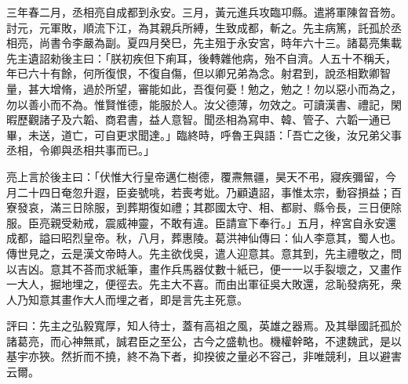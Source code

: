 \begin{pinyinscope}
三年春二月，丞相亮自成都到永安。三月，黃元進兵攻臨卭縣。遣將軍陳曶音笏。討元，元軍敗，順流下江，為其親兵所縛，生致成都，斬之。先主病篤，託孤於丞相亮，尚書令李嚴為副。夏四月癸巳，先主殂于永安宮，時年六十三。諸葛亮集載先主遺詔勑後主曰：「朕初疾但下痢耳，後轉雜他病，殆不自濟。人五十不稱夭，年已六十有餘，何所復恨，不復自傷，但以卿兄弟為念。射君到，說丞相歎卿智量，甚大增脩，過於所望，審能如此，吾復何憂！勉之，勉之！勿以惡小而為之，勿以善小而不為。惟賢惟德，能服於人。汝父德薄，勿效之。可讀漢書、禮記，閑暇歷觀諸子及六韜、商君書，益人意智。聞丞相為寫申、韓、管子、六韜一通已畢，未送，道亡，可自更求聞達。」臨終時，呼魯王與語：「吾亡之後，汝兄弟父事丞相，令卿與丞相共事而已。」

亮上言於後主曰：「伏惟大行皇帝邁仁樹德，覆燾無疆，昊天不弔，寢疾彌留，今月二十四日奄忽升遐，臣妾號咷，若喪考妣。乃顧遺詔，事惟太宗，動容損益；百寮發哀，滿三日除服，到葬期復如禮；其郡國太守、相、都尉、縣令長，三日便除服。臣亮親受勑戒，震威神靈，不敢有違。臣請宣下奉行。」五月，梓宮自永安還成都，謚曰昭烈皇帝。秋，八月，葬惠陵。葛洪神仙傳曰：仙人李意其，蜀人也。傳世見之，云是漢文帝時人。先主欲伐吳，遣人迎意其。意其到，先主禮敬之，問以吉凶。意其不荅而求紙筆，畫作兵馬器仗數十紙已，便一一以手裂壞之，又畫作一大人，掘地埋之，便徑去。先主大不喜。而由出軍征吳大敗還，忿恥發病死，衆人乃知意其畫作大人而埋之者，即是言先主死意。

評曰：先主之弘毅寬厚，知人待士，蓋有高祖之風，英雄之器焉。及其舉國託孤於諸葛亮，而心神無貳，誠君臣之至公，古今之盛軌也。機權幹略，不逮魏武，是以基宇亦狹。然折而不撓，終不為下者，抑揆彼之量必不容己，非唯競利，且以避害云爾。


\end{pinyinscope}